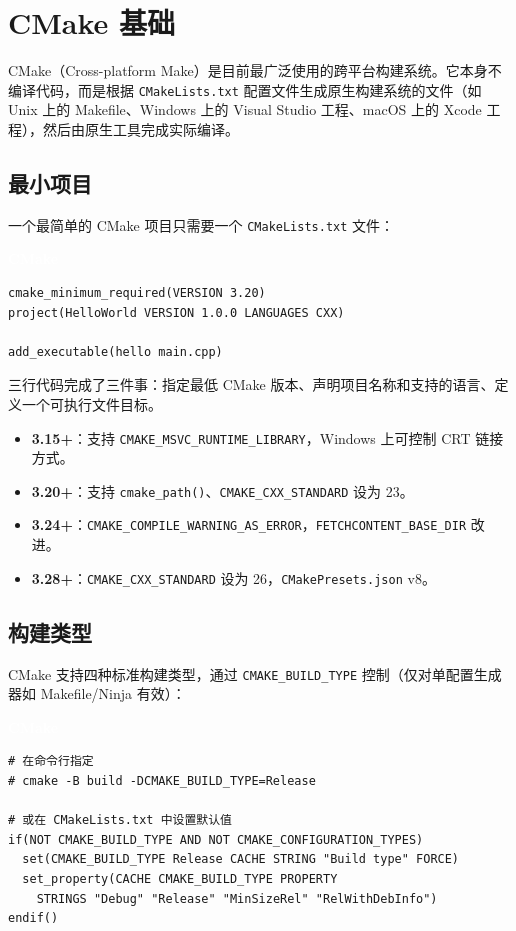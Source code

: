 \documentclass[12pt,a4paper,fontset=fandol]{ctexbook}
\newcommand{\Fn}[1]{\texttt{#1()}}
\newcommand{\Tp}[1]{\texttt{#1}}
\newcommand{\cmakelabel}{%
  \noindent\begin{tcolorbox}[sharp corners,colback=cmakeheadbg,colframe=cmakeheadbg,
    left=6pt,right=6pt,top=2pt,bottom=2pt,boxrule=0pt]
  \textcolor{white}{\small\bfseries\sffamily CMake}\end{tcolorbox}%
}
\begin{document}
\chapter{CMake 基础}

CMake（Cross-platform Make）是目前最广泛使用的跨平台构建系统。它本身不编译代码，而是根据 \Tp{CMakeLists.txt} 配置文件生成原生构建系统的文件（如 Unix 上的 Makefile、Windows 上的 Visual Studio 工程、macOS 上的 Xcode 工程），然后由原生工具完成实际编译。

\section{最小项目}

一个最简单的 CMake 项目只需要一个 \Tp{CMakeLists.txt} 文件：

\cmakelabel
\begin{lstlisting}[style=cmakestyle]
cmake_minimum_required(VERSION 3.20)
project(HelloWorld VERSION 1.0.0 LANGUAGES CXX)

add_executable(hello main.cpp)
\end{lstlisting}

\noindent
三行代码完成了三件事：指定最低 CMake 版本、声明项目名称和支持的语言、定义一个可执行文件目标。

\begin{guideline}[title=CMake 版本选择]
\begin{itemize}
  \item \textbf{3.15+}：支持 \Tp{CMAKE\_MSVC\_RUNTIME\_LIBRARY}，Windows 上可控制 CRT 链接方式。
  \item \textbf{3.20+}：支持 \Fn{cmake\_path}、\Tp{CMAKE\_CXX\_STANDARD} 设为 23。
  \item \textbf{3.24+}：\Tp{CMAKE\_COMPILE\_WARNING\_AS\_ERROR}，\Tp{FETCHCONTENT\_BASE\_DIR} 改进。
  \item \textbf{3.28+}：\Tp{CMAKE\_CXX\_STANDARD} 设为 26，\Tp{CMakePresets.json} v8。
\end{itemize}
\end{guideline}

\section{构建类型}

CMake 支持四种标准构建类型，通过 \Tp{CMAKE\_BUILD\_TYPE} 控制（仅对单配置生成器如 Makefile/Ninja 有效）：

\cmakelabel
\begin{lstlisting}[style=cmakestyle]
# 在命令行指定
# cmake -B build -DCMAKE_BUILD_TYPE=Release

# 或在 CMakeLists.txt 中设置默认值
if(NOT CMAKE_BUILD_TYPE AND NOT CMAKE_CONFIGURATION_TYPES)
  set(CMAKE_BUILD_TYPE Release CACHE STRING "Build type" FORCE)
  set_property(CACHE CMAKE_BUILD_TYPE PROPERTY
    STRINGS "Debug" "Release" "MinSizeRel" "RelWithDebInfo")
endif()
\end{lstlisting}
\end{document}
